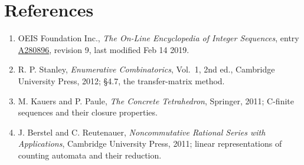 \documentclass[11pt]{article}
\theoremstyle{definition}
\begin{document}
\section{References}

\begin{enumerate}

\item OEIS Foundation Inc., \emph{The On-Line Encyclopedia of Integer Sequences}, entry \href{https://oeis.org/A280896}{A280896}, revision 9, last modified Feb 14 2019.

\item R. P. Stanley, \emph{Enumerative Combinatorics}, Vol.~1, 2nd ed., Cambridge University Press, 2012; \S4.7, the transfer-matrix method.

\item M. Kauers and P. Paule, \emph{The Concrete Tetrahedron}, Springer, 2011; C-finite sequences and their closure properties.

\item J. Berstel and C. Reutenauer, \emph{Noncommutative Rational Series with Applications}, Cambridge University Press, 2011; linear representations of counting automata and their reduction.

\end{enumerate}
\end{document}
